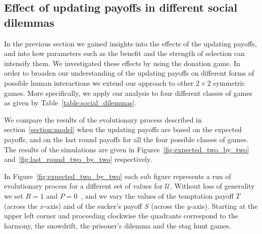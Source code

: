 \documentclass[11pt]{article}
\theoremstyle{plainCl1}
\theoremstyle{plainCl2}
\begin{document}
\subsection{Effect of updating payoffs in different social dilemmas}\label{section:2_by_2_games}

In the previous section we gained insights into the effects of the updating
payoffs, and into how parameters such as the benefit and the strength of
selection can intensify them. We investigated these effects by using the
donation game. In order to broaden our understanding of the updating payoffs on
different forms of possible human interactions we extend our approach to other
\(2 \times 2\) symmetric games. More specifically, we apply our analysis to four
different classes of games as given by Table~\ref{table:social_dilemmas}.

\begin{table}[!htbp]
  \begin{center}
  \end{center}
\caption{\textbf{Social dilemmas and preference ordering}. The four classes of
social dilemmas we explore in this work.}
\label{table:social_dilemmas}
\end{table}

We compare the results of the evolutionary process described in
section~\ref{section:model} when the updating payoffs are based on the expected
payoffs, and on the last round payoffs for all the four possible classes of
games. The results of the simulations are given in
Figures~\ref{fig:expected_two_by_two} and~\ref{fig:last_round_two_by_two}
respectively.

In Figure~\ref{fig:expected_two_by_two} each sub figure represents a run of
evolutionary process for a different set of values for \(\mathcal{U}\). Without
loss of generality we set \(R=1\) and \(P=0\)~\cite{Martinez2012, Roca2009}, and
we vary the values of the temptation payoff \(T\) (across the \(x\)-axis) and of
the sucker's payoff \(S\) (across the \(y\)-axis). Starting at the upper left
corner and proceeding clockwise the quadrants correspond to the harmony, the
snowdrift, the prisoner's dilemma and the stag hunt games.
\end{document}
